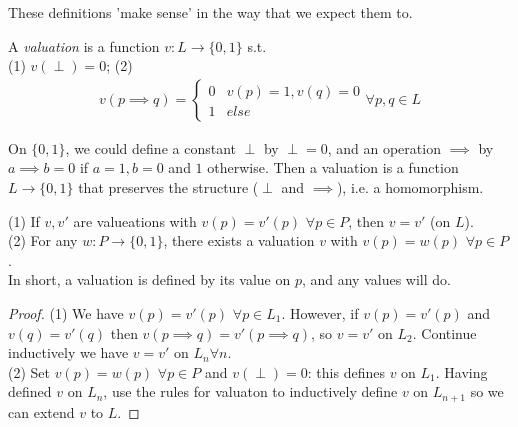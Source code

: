 \documentclass[a4paper]{article}
\begin{document}
These definitions 'make sense' in the way that we expect them to.

\begin{defi}
A \emph{valuation} is a function $v:L \to \{0,1\}$ s.t.\\
(1) $v(\perp) = 0$;
(2) 
\begin{equation*}
\begin{aligned}
v(p \implies q) = \left\{ \begin{array}{ll}
0 & v(p) =1, v(q) = 0\\
1 & else
\end{array}
\right. \forall p,q \in L
\end{aligned}
\end{equation*}
\end{defi}

\begin{rem}
On $\{0,1\}$, we could define a constant $\perp$ by $\perp = 0$, and an operation $\implies$ by $a \implies b = 0$ if $a=1, b=0$ and $1$ otherwise. Then a valuation is a function $L \to \{0,1\}$ that preserves the structure ($\perp$ and $\implies$), i.e. a homomorphism.
\end{rem}

\begin{prop}
(1) If $v,v'$ are valueations with $v(p) = v'(p)$ $\forall p \in P$, then $v=v'$ (on $L$).\\
(2) For any $w:P \to \{0,1\}$, there exists a valuation $v$ with $v(p) = w(p)$ $\forall p \in P$.\\
In short, a valuation is defined by its value on $p$, and any values will do.
\begin{proof}
(1) We have $v(p)=v'(p)$ $\forall p \in L_1$. However, if $v(p) = v'(p)$ and $v(q) = v'(q)$ then $v(p \implies q) = v'(p \implies q)$, so $v=v'$ on $L_2$. Continue inductively we have $v=v'$ on $L_n \forall n$.\\
(2) Set $v(p) = w(p)$ $\forall p \in P$ and $v(\perp) = 0$: this defines $v$ on $L_1$. Having defined $v$ on $L_n$, use the rules for valuaton to inductively define $v$ on $L_{n+1}$ so we can extend $v$ to $L$.
\end{proof}
\end{prop}
\end{document}
